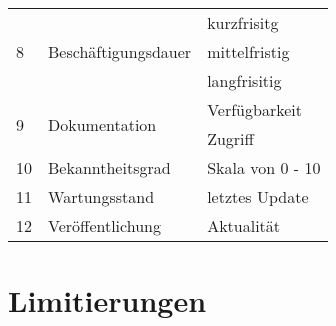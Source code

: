 \begin{table}
\begin{tabular}{|l|l|l|}
\multirow{3}{*}{8} & \multirow{3}{*}{Beschäftigungsdauer} & kurzfrisitg \\
                   &                                      & mittelfristig \\
                   &                                      & langfrisitig \\ 
\hline

\multirow{2}{*}{9} & \multirow{2}{*}{Dokumentation} & Verfügbarkeit \\
                   &                                & Zugriff \\
\hline

10 & Bekanntheitsgrad & Skala von 0 - 10 \\
\hline

11 & Wartungsstand & letztes Update \\
\hline

12 & Veröffentlichung & Aktualität \\
\hline

\end{tabular}
\end{table}

\section{Limitierungen}
